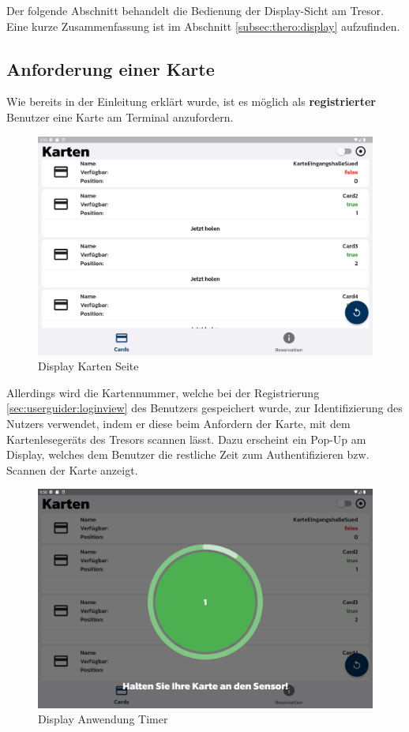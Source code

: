 {\label{sec:userguider:displayview}
Der folgende Abschnitt behandelt die Bedienung der Display-Sicht am Tresor. Eine kurze Zusammenfassung ist im Abschnitt \ref{subsec:thero:display}  aufzufinden.

\subsection{Anforderung einer Karte}
Wie bereits in der Einleitung erklärt wurde, ist es möglich als {\textbf{registrierter}} Benutzer eine Karte am Terminal anzufordern.
\begin{figure}[!h]
\centering
\includegraphics[width=1\textwidth]{FLUTTER/images/GP/Display_Allg.png}
\caption{Display Karten Seite}
\end{figure}

\newpage
Allerdings wird die Kartennummer, welche bei der Registrierung \ref{sec:userguider:loginview} des Benutzers gespeichert wurde, zur Identifizierung des Nutzers verwendet, indem er diese beim Anfordern der Karte, mit dem Kartenlesegeräts des Tresors scannen lässt. Dazu erscheint ein Pop-Up am Display, welches dem Benutzer die restliche Zeit zum Authentifizieren bzw. Scannen der Karte anzeigt. 


\begin{figure}[!h]
\centering
\includegraphics[width=1\textwidth]{FLUTTER/images/GP/Display_Timer.png}
\caption{Display Anwendung Timer}
  \label{fig:display:timer}
\end{figure}

}
